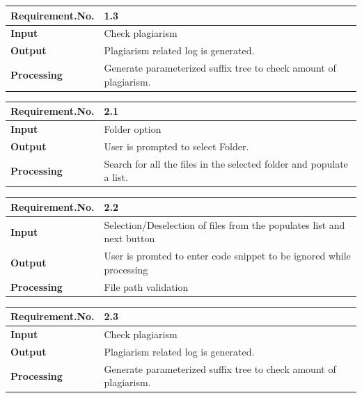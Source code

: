\documentclass[11pt]{article}
\begin{document}
  \begin{center}
    \begin{tabular}{ | l | p{10cm} |}
    \hline
    {\textbf{Requirement.No.}} & {1.3} \\ \hline
    \textbf{Input}      & Check plagiarism \\ \hline
    \textbf{Output}     & Plagiarism related log is generated.  \\ \hline
    \textbf{Processing} & Generate parameterized suffix tree to check amount of plagiarism. \\ \hline
    \end{tabular}
\end{center}

  \begin{center}
    \begin{tabular}{ | l | p{10cm} |}
    \hline
    {\textbf{Requirement.No.}} & {2.1} \\ \hline
    \textbf{Input}      & Folder option \\ \hline
    \textbf{Output}     & User is prompted to select Folder. \\ \hline
    \textbf{Processing} & Search for all the files in the selected folder and populate a list. \\ \hline
    \end{tabular}
\end{center}

  \begin{center}
    \begin{tabular}{ | l | p{10cm} |}
    \hline
    {\textbf{Requirement.No.}} & {2.2} \\ \hline
    \textbf{Input}      & Selection/Deselection of files from the populates list and next button \\ \hline
    \textbf{Output}     & User is promted to enter code snippet to be ignored while processing \\ \hline
    \textbf{Processing} & File path validation \\ \hline
    \end{tabular}
\end{center}

  \begin{center}
    \begin{tabular}{ | l | p{10cm} |}
    \hline
    {\textbf{Requirement.No.}} & {2.3} \\ \hline
    \textbf{Input}      & Check plagiarism \\ \hline
    \textbf{Output}     & Plagiarism related log is generated.  \\ \hline
    \textbf{Processing} & Generate parameterized suffix tree to check amount of plagiarism. \\ \hline
    \end{tabular}
\end{center}                    
\end{document}
